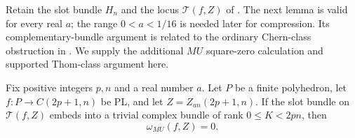 Retain the slot bundle $H_n$ and the locus $\mathcal T(f,Z)$ of
.  The next lemma is valid for every real $a$;
the range $0<a<1/16$ is needed later for compression.  Its
complementary-bundle argument is related to the ordinary Chern-class
obstruction in \cite[proof of Theorem~3.3 in the author preprint]{HirshbergPhillips2022}.
We supply the additional
$MU$ square-zero calculation and supported Thom-class argument here.


\begin{lemma}
\label{lem:torus-mu}
Fix positive integers $p,n$ and a real number $a$.
Let $P$ be a finite polyhedron, let $f:P\to C(2p+1,n)$ be PL, and
let $Z=Z_{an}(2p+1,n)$.  If the slot bundle on $\mathcal T(f,Z)$
embeds into a trivial complex bundle of rank $0\le K<2pn$, then
\[
 \omega_{MU}(f,Z)=0.
\]
\end{lemma}

